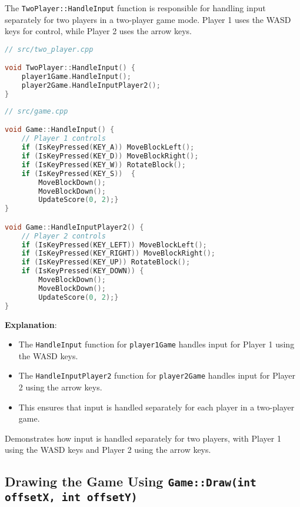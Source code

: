 \documentclass{article}
\begin{document}
The \texttt{TwoPlayer::HandleInput} function is responsible for handling input separately for two players in a two-player game mode. Player 1 uses the WASD keys for control, while Player 2 uses the arrow keys.

\begin{lstlisting}[language=C++]
// src/two_player.cpp

void TwoPlayer::HandleInput() {
    player1Game.HandleInput();
    player2Game.HandleInputPlayer2();
}
\end{lstlisting}

\begin{lstlisting}[language=C++]
// src/game.cpp

void Game::HandleInput() {
    // Player 1 controls
    if (IsKeyPressed(KEY_A)) MoveBlockLeft();
    if (IsKeyPressed(KEY_D)) MoveBlockRight();
    if (IsKeyPressed(KEY_W)) RotateBlock();
    if (IsKeyPressed(KEY_S))  {
        MoveBlockDown();
        MoveBlockDown();
        UpdateScore(0, 2);}
}

void Game::HandleInputPlayer2() {
    // Player 2 controls
    if (IsKeyPressed(KEY_LEFT)) MoveBlockLeft();
    if (IsKeyPressed(KEY_RIGHT)) MoveBlockRight();
    if (IsKeyPressed(KEY_UP)) RotateBlock();
    if (IsKeyPressed(KEY_DOWN)) {
        MoveBlockDown();
        MoveBlockDown();
        UpdateScore(0, 2);}
}

\end{lstlisting}

\textbf{Explanation}:

\begin{itemize}
    \item The \texttt{HandleInput} function for \texttt{player1Game} handles input for Player 1 using the WASD keys.
    \item The \texttt{HandleInputPlayer2} function for \texttt{player2Game} handles input for Player 2 using the arrow keys.
    \item This ensures that input is handled separately for each player in a two-player game.
\end{itemize}

Demonstrates how input is handled separately for two players, with Player 1 using the WASD keys and Player 2 using the arrow keys.
\subsection{Drawing the Game Using \texttt{Game::Draw(int offsetX, int offsetY)}}
\end{document}
